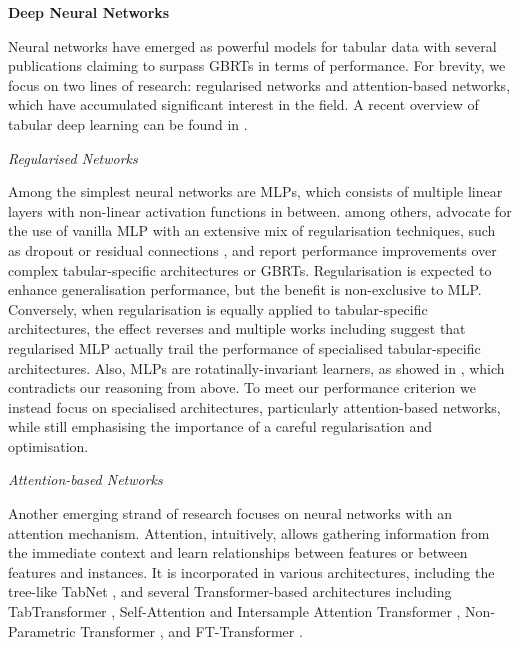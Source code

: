 \textbf{Deep Neural Networks}

Neural networks have emerged as powerful models for tabular data with several publications claiming to surpass \glspl{GBRT} in terms of performance. For brevity, we focus on two lines of research: regularised networks and attention-based networks, which have accumulated significant interest in the field. A recent overview of tabular deep learning can be found in \textcite[][1--22]{borisovDeepNeuralNetworks2022}.

\emph{Regularised Networks}

Among the simplest neural networks are \glspl{MLP}, which consists of multiple linear layers with non-linear activation functions in between. \textcite[][9--10]{kadraWelltunedSimpleNets2021} among others, advocate for the use of vanilla \gls{MLP} with an extensive mix of regularisation techniques, such as dropout \autocite{srivastavaDropoutSimpleWay} or residual connections \autocite{heDeepResidualLearning2015}, and report performance improvements over complex tabular-specific architectures or \glspl{GBRT}. Regularisation is expected to enhance generalisation performance, but the benefit is non-exclusive to \gls{MLP}. Conversely, when regularisation is equally applied to tabular-specific architectures, the effect reverses and multiple works including \textcites[][7]{gorishniyRevisitingDeepLearning2021}[][5]{grinsztajnWhyTreebasedModels2022} suggest that regularised \gls{MLP} actually trail the performance of specialised tabular-specific architectures. Also, \glspl{MLP} are rotatinally-invariant learners, as showed in \textcite[][5]{grinsztajnWhyTreebasedModels2022}, which contradicts our reasoning from above. To meet our performance criterion we instead focus on specialised architectures, particularly attention-based networks, while still emphasising the importance of a careful regularisation and optimisation.

\emph{Attention-based Networks}

Another emerging strand of research focuses on neural networks with an attention mechanism. Attention, intuitively, allows gathering information from the immediate context and learn relationships between features or between features and instances. It is incorporated in various architectures, including the tree-like TabNet \autocite[][3--5]{arikTabnetAttentiveInterpretable2020}, and several Transformer-based architectures including TabTransformer \autocite[][2--3]{huangTabTransformerTabularData2020}, Self-Attention and Intersample Attention Transformer \autocite[][4--5]{somepalliSaintImprovedNeural2021}, Non-Parametric Transformer \autocite[][3--4]{kossenSelfAttentionDatapointsGoing2021}, and FT-Transformer \autocite[][4--5]{gorishniyRevisitingDeepLearning2021}.

